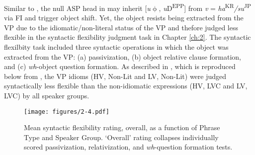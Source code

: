 \ea\label{ex:115}

\z


\hspace*{-1.5mm}Similar to , the null \ac{ASP} head in  may inherit [\textit{u}$\upphi$, \textit{u}D\textsuperscript{EPP}] from \textit{v} = \textit{ha}\textsuperscript{KR}\textit{/su}\textsuperscript{JP} via \ac{FI} and trigger object shift. Yet, the object resists being extracted from the   \acs{VP} due to the idiomatic/non-literal status of the   \acs{VP} and thefore judged less flexible in the syntactic flexibility judgment task in Chapter \ref{ch:2}. The syntactic flexilbity task included three syntactic operations in which the object was extracted from the   \acs{VP}: (a) passivization, (b) object relative clause formation, and (c) \textit{wh}-object question formation. As described in , which is reproduced below from , the   \acs{VP} idioms (\acs{HV}, Non-Lit and   \acs{LV}, Non-Lit) were judged syntactically less flexible than the non-idiomatic expressions (\acs{HV},   \acs{LVC} and   \acs{LV},   \acs{LVC}) by all speaker groups.

\begin{figure}
\caption{Mean syntactic flexibility rating, overall, as a function of Phrase Type and Speaker Group. ‘Overall’ rating collapses individually scored passivization, relativization, and \textit{wh}-question formation tests.} \label{fig:2.4again}
\texttt{[image: figures/2-4.pdf]}
\end{figure}

